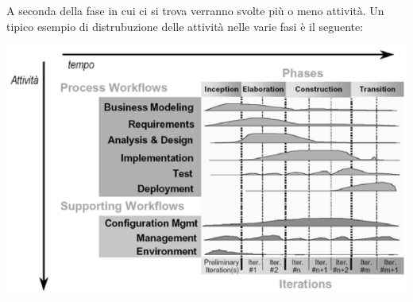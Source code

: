 A seconda della fase in cui ci si trova verranno svolte più o meno attività. 
Un tipico esempio di distrubuzione delle attività nelle varie fasi è il seguente:
\begin{center}
   \includegraphics[width= \textwidth]{assets/fasiworkflow}
\end{center}